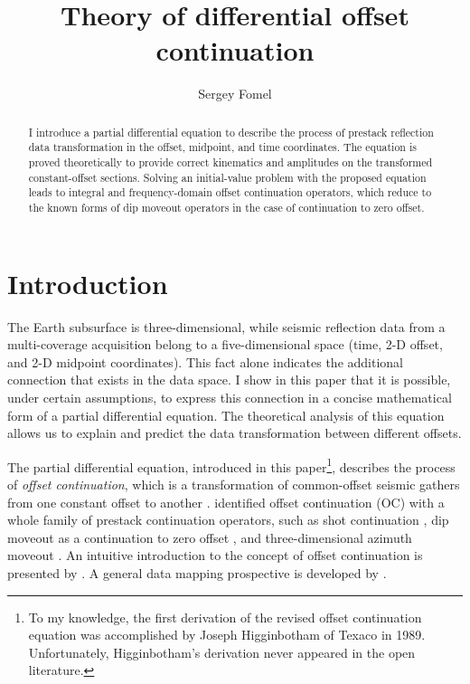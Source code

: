 \title{Theory of differential offset continuation}
\author{Sergey Fomel}

\maketitle

\begin{abstract}
 I introduce a partial differential equation to describe the
  process of prestack reflection data transformation in the offset,
  midpoint, and time coordinates. The equation is proved theoretically
  to provide correct kinematics and amplitudes on the transformed
  constant-offset sections. Solving an initial-value problem with the
  proposed equation leads to integral and frequency-domain offset
  continuation operators, which reduce to the known forms of dip
  moveout operators in the case of continuation to zero offset.  
\end{abstract}

\section{Introduction}
  
The Earth subsurface is three-dimensional, while seismic reflection
data from a multi-coverage acquisition belong to a five-dimensional
space (time, 2-D offset, and 2-D midpoint coordinates). This fact
alone indicates the additional connection that exists
in the data space. I show in this paper that it is possible, under
certain assumptions, to express this connection in a concise
mathematical form of a partial differential equation. The theoretical
analysis of this equation allows us to explain and predict the data
transformation between different offsets.
  
The partial differential equation, introduced in this
paper\footnote{To my knowledge, the first derivation of the revised
offset continuation equation was accomplished by Joseph Higginbotham
of Texaco in 1989.  Unfortunately, Higginbotham's derivation never
appeared in the open literature.}, describes the process of
\emph{offset continuation}, which is a transformation of common-offset
seismic gathers from one constant offset to another
\cite[]{GPR30-06-08130828}. \cite{GEO61-06-18461858} identified offset
continuation (OC) with a whole family of prestack continuation
operators, such as shot continuation \cite[]{SEG-1993-0673}, dip
moveout as a continuation to zero offset \cite[]{DMObook}, and
three-dimensional azimuth moveout \cite[]{GEO63-02-05740588}. An
intuitive introduction to the concept of offset continuation is
presented by \cite{TLE20-01-02100213}. A general data mapping
prospective is developed by \cite{GPR48-01-01350162}.
   
